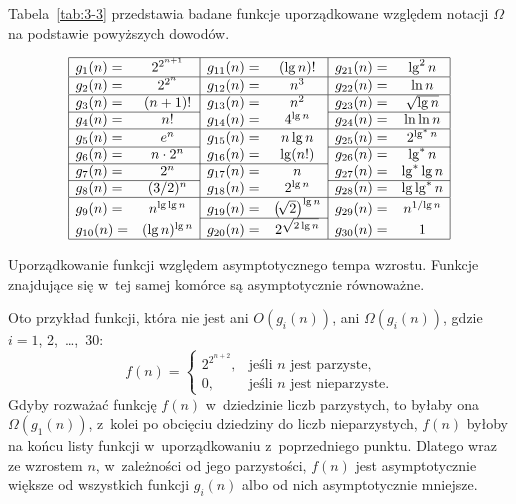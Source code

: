 Tabela~\ref{tab:3-3} przedstawia badane funkcje uporządkowane względem notacji $\Omega$ na podstawie powyższych dowodów.
\begin{table}[ht]
	\begin{center}
		\[
			\begin{array}{|lc|lc|lc|} \hline
				g_1(n)= & 2^{2^{n+1}} & g_{11}(n)= & (\lg n)! & g_{21}(n)= & \lg^2n \\ \hline
				g_2(n)= & 2^{2^n} & g_{12}(n)= & n^3 & g_{22}(n)= & \ln n \\ \hline
				g_3(n)= & (n+1)! & g_{13}(n)= & n^2 & g_{23}(n)= & \sqrt{\lg n} \\ \cline{1-2}\cline{5-6}
				g_4(n)= & n! & g_{14}(n)= & 4^{\lg n} & g_{24}(n)= & \ln\ln n \\ \hline
				g_5(n)= & e^n & g_{15}(n)= & n\lg n & g_{25}(n)= & 2^{\lg^*n} \\ \cline{1-2}\cline{5-6}
				g_6(n)= & n\cdot2^n & g_{16}(n)= & \lg(n!) & g_{26}(n)= & \lg^*n \\ \cline{1-4}
				g_7(n)= & 2^n & g_{17}(n)= & n & g_{27}(n)= & \lg^*\lg n \\ \cline{1-2}\cline{5-6}
				g_8(n)= & (3/2)^n & g_{18}(n)= & 2^{\lg n} & g_{28}(n)= & \lg\lg^*n \\ \hline
				g_9(n)= & n^{\lg\lg n} & g_{19}(n)= & \bigl(\!\sqrt{2}\bigr)^{\lg n} & g_{29}(n)= & n^{1/\!\lg n} \\ \cline{3-4}
				g_{10}(n)= & (\lg n)^{\lg n} & g_{20}(n)= & 2^{\sqrt{2\lg n}} & g_{30}(n)= & 1 \\ \hline
			\end{array}
		\]
	\end{center}
	\caption{Uporządkowanie funkcji względem asymptotycznego tempa wzrostu. Funkcje znajdujące się w~tej samej komórce są asymptotycznie równoważne.} \label{tab:3-3}
\end{table}

\subproblem %
Oto przykład funkcji, która nie jest ani $O(g_i(n))$, ani $\Omega(g_i(n))$, gdzie $i=1$, 2,~\dots,~30:
\[
	f(n) =
	\begin{cases}
		2^{2^{n+2}}, & \text{jeśli $n$ jest parzyste,} \\
		0, & \text{jeśli $n$ jest nieparzyste}.
	\end{cases}
\]
Gdyby rozważać funkcję $f(n)$ w~dziedzinie liczb parzystych, to byłaby ona $\Omega(g_1(n))$, z~kolei po obcięciu dziedziny do liczb nieparzystych, $f(n)$ byłoby na końcu listy funkcji w~uporządkowaniu z~poprzedniego punktu. Dlatego wraz ze wzrostem $n$, w~zależności od jego parzystości, $f(n)$ jest asymptotycznie większe od wszystkich funkcji $g_i(n)$ albo od nich asymptotycznie mniejsze.

